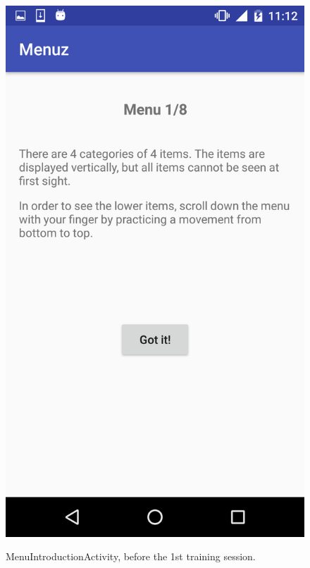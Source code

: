 \begin{figure}[!ht]
  \begin{center}
    \includegraphics[scale=0.22]{img/menuintro_activity.png}
    \label{fig:menuintro_activity}
    \caption{MenuIntroductionActivity, before the 1st training session.}
  \end{center}
\end{figure}

\newpage

